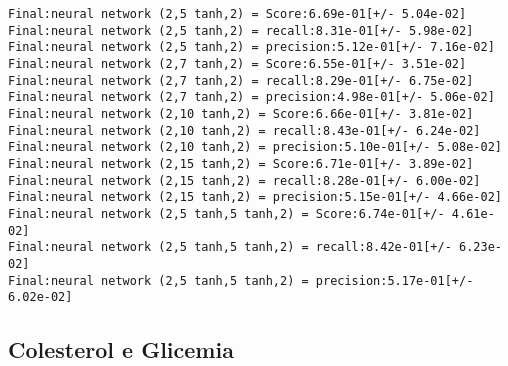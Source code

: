 \documentclass[11pt]{article}
\begin{document}
    \begin{Verbatim}[commandchars=\\\{\}]
Final:neural network (2,5 tanh,2) = Score:6.69e-01[+/- 5.04e-02]
Final:neural network (2,5 tanh,2) = recall:8.31e-01[+/- 5.98e-02]
Final:neural network (2,5 tanh,2) = precision:5.12e-01[+/- 7.16e-02]
Final:neural network (2,7 tanh,2) = Score:6.55e-01[+/- 3.51e-02]
Final:neural network (2,7 tanh,2) = recall:8.29e-01[+/- 6.75e-02]
Final:neural network (2,7 tanh,2) = precision:4.98e-01[+/- 5.06e-02]
Final:neural network (2,10 tanh,2) = Score:6.66e-01[+/- 3.81e-02]
Final:neural network (2,10 tanh,2) = recall:8.43e-01[+/- 6.24e-02]
Final:neural network (2,10 tanh,2) = precision:5.10e-01[+/- 5.08e-02]
Final:neural network (2,15 tanh,2) = Score:6.71e-01[+/- 3.89e-02]
Final:neural network (2,15 tanh,2) = recall:8.28e-01[+/- 6.00e-02]
Final:neural network (2,15 tanh,2) = precision:5.15e-01[+/- 4.66e-02]
Final:neural network (2,5 tanh,5 tanh,2) = Score:6.74e-01[+/- 4.61e-02]
Final:neural network (2,5 tanh,5 tanh,2) = recall:8.42e-01[+/- 6.23e-02]
Final:neural network (2,5 tanh,5 tanh,2) = precision:5.17e-01[+/- 6.02e-02]

    \end{Verbatim}

    \subsection{Colesterol e Glicemia}\label{colesterol-e-glicemia}
\end{document}
